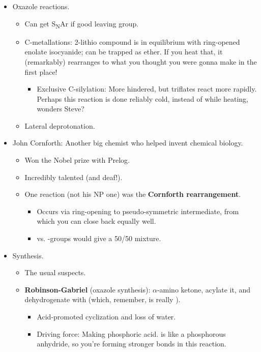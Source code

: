 \documentclass[../notes.tex]{subfiles}
\begin{document}
\begin{itemize}
\begin{itemize}
    \end{itemize}
    \item Oxazole reactions.
    \begin{itemize}
        \item Can get S\textsubscript{N}Ar if good leaving group.
        \item C-metallations: 2-lithio compound is in equilibrium with ring-opened enolate isocyanide; can be trapped as  ether. If you heat that, it (remarkably) rearranges to what you thought you were gonna make in the first place!
        \begin{itemize}
            \item Exclusive C-silylation: More hindered, but triflates react more rapidly. Perhaps this reaction is done reliably cold, instead of while heating, wonders Steve?
        \end{itemize}
        \item Lateral deprotonation.
    \end{itemize}
    \item John Cornforth: Another big chemist who helped invent chemical biology.
    \begin{itemize}
        \item Won the Nobel prize with Prelog.
        \item Incredibly talented (and deaf!).
        \item One reaction (not his NP one) was the \textbf{Cornforth rearrangement}.
        \begin{itemize}
            \item Occurs via ring-opening to pseudo-symmetric intermediate, from which you can close back equally well.
            \item {} vs.  -groups would give a 50/50 mixture.
        \end{itemize}
    \end{itemize}
    \item Synthesis.
    \begin{itemize}
        \item The usual suspects.
        \item \textbf{Robinson-Gabriel} (oxazole synthesis): $\alpha$-amino ketone, acylate it, and dehydrogenate with  (which, remember, is really ).
        \begin{itemize}
            \item Acid-promoted cyclization and loss of water.
            \item Driving force: Making phosphoric acid.  is like a phosphorous anhydride, so you're forming stronger  bonds in this reaction.

\end{itemize}
\end{itemize}
\end{itemize}
\end{document}
